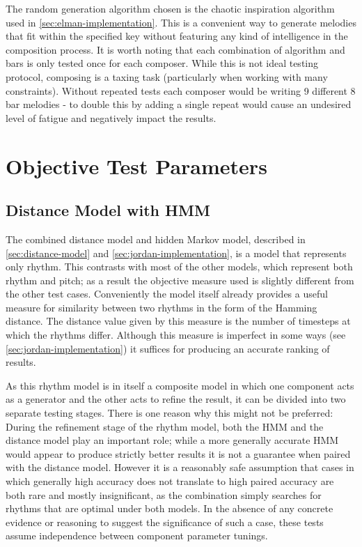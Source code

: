 \documentclass[ author={Stephen Livermore-Tozer},
				supervisor={Dr. Peter Flach},
				degree={MEng},
				title={Algorithmic Co-composition Using Machine Learning},
				subtitle={},
				type={research},
				year={2016} ]{dissertation}
\begin{document}
	The random generation algorithm chosen is the chaotic inspiration algorithm used in \ref{sec:elman-implementation}. This is a convenient way to generate melodies that fit within the specified key without featuring any kind of intelligence in the composition process. It is worth noting that each combination of algorithm and bars is only tested once for each composer. While this is not ideal testing protocol, composing is a taxing task (particularly when working with many constraints). Without repeated tests each composer would be writing 9 different 8 bar melodies - to double this by adding a single repeat would cause an undesired level of fatigue and negatively impact the results. 
	
	\section{Objective Test Parameters}
	
	\subsection{Distance Model with HMM}
	
	The combined distance model and hidden Markov model, described in \ref{sec:distance-model} and \ref{sec:jordan-implementation}, is a model that represents only rhythm. This contrasts with most of the other models, which represent both rhythm and pitch; as a result the objective measure used is slightly different from the other test cases. Conveniently the model itself already provides a useful measure for similarity between two rhythms in the form of the Hamming distance. The distance value given by this measure is the number of timesteps at which the rhythms differ. Although this measure is imperfect in some ways (see \ref{sec:jordan-implementation}) it suffices for producing an accurate ranking of results.
	
	As this rhythm model is in itself a composite model in which one component acts as a generator and the other acts to refine the result, it can be divided into two separate testing stages. There is one reason why this might not be preferred: During the refinement stage of the rhythm model, both the HMM and the distance model play an important role; while a more generally accurate HMM would appear to produce strictly better results it is not a guarantee when paired with the distance model. However it is a reasonably safe assumption that cases in which generally high accuracy does not translate to high paired accuracy are both rare and mostly insignificant, as the combination simply searches for rhythms that are optimal under both models. In the absence of any concrete evidence or reasoning to suggest the significance of such a case, these tests assume independence between component parameter tunings.
	
\end{document}
